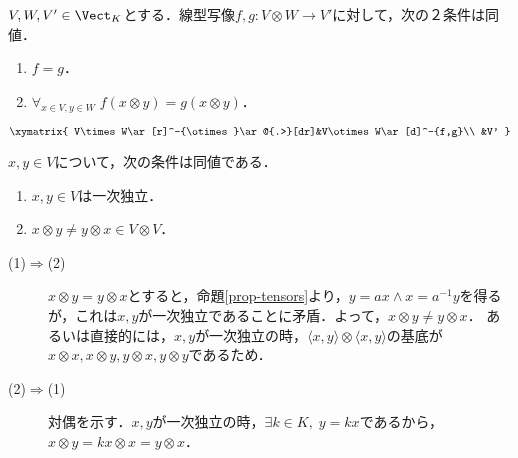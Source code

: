 \documentclass[uplatex, dvipdfmx]{jsreport}
\begin{document}
\begin{proposition}\label{prop-linear-map-from-tensor-product-is-determined-by-basis-destination}
    $V,W,V'\in\Vect_K$とする．線型写像$f,g:V\otimes W\to V'$に対して，次の２条件は同値．
    \begin{enumerate}
        \item $f=g$．
        \item $\forall_{x\in V,y\in W}\;f(x\otimes y)=g(x\otimes y)$．
    \end{enumerate}
    \[\xymatrix{
        V\times W\ar[r]^-{\otimes}\ar@{.>}[dr]&V\otimes W\ar[d]^-{f,g}\\
        &V'
    }\]
\end{proposition}

\begin{proposition}[テンソルの非可換条件]
    $x,y\in V$について，次の条件は同値である．
    \begin{enumerate}
        \item $x,y\in V$は一次独立．
        \item $x\otimes y\ne y\otimes x\in V\otimes V$．
    \end{enumerate}
\end{proposition}
\begin{Proof}\mbox{}
    \begin{description}
        \item[(1)$\Rightarrow$(2)] $x\otimes y=y\otimes x$とすると，命題\ref{prop-tensors}より，$y=ax\land x=a^{-1}y$を得るが，これは$x,y$が一次独立であることに矛盾．よって，$x\otimes y\ne y\otimes x$．
        あるいは直接的には，$x,y$が一次独立の時，$\langle x,y\rangle\otimes\langle x,y\rangle$の基底が$x\otimes x,x\otimes y,y\otimes x,y\otimes y$であるため．
        \item[(2)$\Rightarrow$(1)] 対偶を示す．$x,y$が一次独立の時，$\exists k\in K,\; y=kx$であるから，$x\otimes y=kx\otimes x=y\otimes x$．
    \end{description}
\end{Proof}
\end{document}
